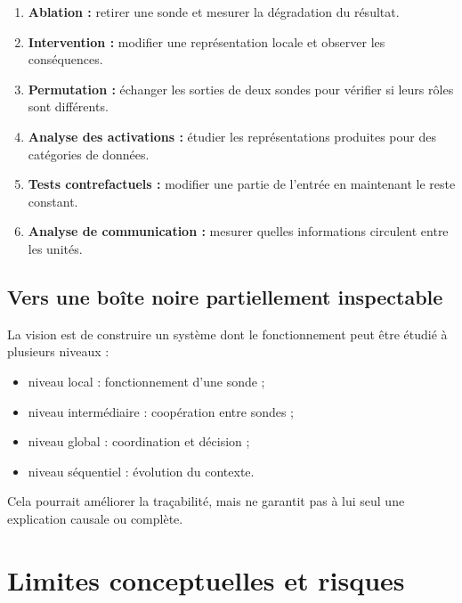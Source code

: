 \documentclass[11pt,a4paper]{report}
\begin{document}
\begin{enumerate}
  \item \textbf{Ablation :} retirer une sonde et mesurer
  la dégradation du résultat.

  \item \textbf{Intervention :} modifier une représentation
  locale et observer les conséquences.

  \item \textbf{Permutation :} échanger les sorties de deux
  sondes pour vérifier si leurs rôles sont différents.

  \item \textbf{Analyse des activations :} étudier les
  représentations produites pour des catégories de données.

  \item \textbf{Tests contrefactuels :} modifier une partie
  de l'entrée en maintenant le reste constant.

  \item \textbf{Analyse de communication :} mesurer quelles
  informations circulent entre les unités.
\end{enumerate}

\section{Vers une boîte noire partiellement inspectable}

La vision est de construire un système dont le fonctionnement
peut être étudié à plusieurs niveaux :

\begin{itemize}
  \item niveau local : fonctionnement d'une sonde ;
  \item niveau intermédiaire : coopération entre sondes ;
  \item niveau global : coordination et décision ;
  \item niveau séquentiel : évolution du contexte.
\end{itemize}

Cela pourrait améliorer la traçabilité, mais ne garantit
pas à lui seul une explication causale ou complète.

\chapter{Limites conceptuelles et risques}
\end{document}
